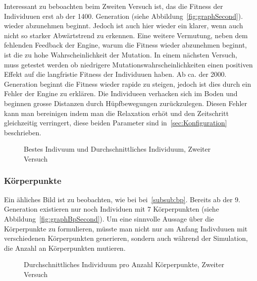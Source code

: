         Interessant zu beboachten beim Zweiten Versuch ist, das die Fitness der Individuuen erst ab der 1400. Generation (siehe Abbildung~\ref{fig:graphSecond}).
        wieder abzunehmen beginnt. Jedoch ist auch hier wieder ein klarer, wenn auch nicht so starker Abwärtstrend zu erkennen.
        Eine weitere Vermutung, neben dem fehlenden Feedback der Engine, warum die Fitness wieder abzunehmen beginnt,
        ist die zu hohe Wahrscheinlichkeit der Mutation. In einem nächsten Versuch, muss getestet werden ob niedrigere Mutationswahrscheinlichkeiten
        einen positiven Effekt auf die langfristie Fitness der Individuuen haben. Ab ca\@. der 2000. Generation beginnt die Fitness wieder rapide zu steigen,
        jedoch ist dies durch ein Fehler der Engine zu erklären. Die Individueen verhacken sich im Boden und beginnen grosse Distanzen durch Hüpfbewegungen zurückzulegen.
        Diesen Fehler kann man bereinigen indem man die Relaxation erhöt und den Zeitschritt gleichzeitig verringert, diese beiden Parameter sind in~\ref{sec:Konfiguration} beschrieben.

        \begin{figure}
          
          \caption{Bestes Indivuum und Durchschnittliches Individuum, Zweiter Versuch\label{fig:graphThird}}
        \end{figure}

        \subsubsection{Körperpunkte}

          Ein ähliches Bild ist zu beobachten, wie bei bei~\ref{subsub:bp}.
          Bereits ab der 9\@. Generation existieren nur noch Individuen mit 7 Körperpunkten (siehe Abbildung~\ref{fig:graphBpSecond}).
          Um eine sinnvolle Aussage über die Körperpunkte zu formulieren, müsste man nicht nur am Anfang Indivduuen mit verschiedenen Körperpunkten generieren,
          sondern auch während der Simulation, die Anzahl an Körperpunkten mutieren.

          \begin{figure}
            
            \caption{Durchschnittliches Individuum pro Anzahl Körperpunkte, Zweiter Versuch\label{fig:graphBpThird}}
          \end{figure}
